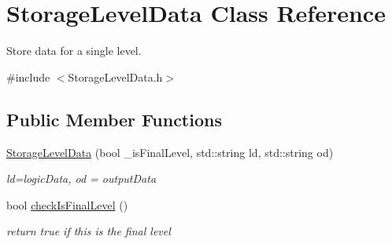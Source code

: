\hypertarget{class_storage_level_data}{}\section{Storage\+Level\+Data Class Reference}
\label{class_storage_level_data}


Store data for a single level.  




{\ttfamily \#include $<$Storage\+Level\+Data.\+h$>$}

\subsection*{Public Member Functions}
\begin{DoxyCompactItemize}
\item 
\mbox{\label{class_storage_level_data_a3e4dc87af17f1673a2faf8b415275cd8}} 
\mbox{\hyperlink{class_storage_level_data_a3e4dc87af17f1673a2faf8b415275cd8}{Storage\+Level\+Data}} (bool \+\_\+is\+Final\+Level, std\+::string ld, std\+::string od)
\begin{DoxyCompactList}\small\item\em ld=logic\+Data, od = output\+Data \end{DoxyCompactList}\item 
\mbox{\label{class_storage_level_data_ae15bb62bb03d49e86df4cd7365fc45ea}} 
bool \mbox{\hyperlink{class_storage_level_data_ae15bb62bb03d49e86df4cd7365fc45ea}{check\+Is\+Final\+Level}} ()
\begin{DoxyCompactList}\small\item\em return true if this is the final level \end{DoxyCompactList}\end{DoxyCompactItemize}
